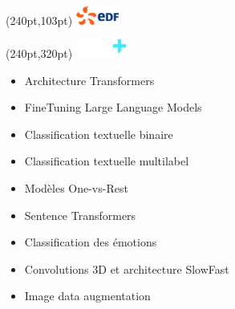 \documentclass[10pt]{src/altacv}
\begin{document}
\begin{paracol}{2}

\begin{textblock*}{1cm}(240pt,103pt)
  {\includegraphics[height=0.6cm]{images/logo-edf.png}}
\end{textblock*}
\begin{textblock*}{1cm}(240pt,320pt)
  \colorbox{innov-plus-color}{\includegraphics[height=0.6cm]{images/logo-innov-plus.png}}
\end{textblock*}


\begin{itemize}
    \item Architecture Transformers
    \item FineTuning Large Language Models
    \item Classification textuelle binaire
    \item Classification textuelle multilabel
    \item Modèles One-vs-Rest
    \item Sentence Transformers

\end{itemize}

\divider

\begin{itemize}
    \item Classification des émotions
    \item Convolutions 3D et architecture SlowFast
    \item Image data augmentation
\end{itemize}


\end{paracol}
\end{document}
